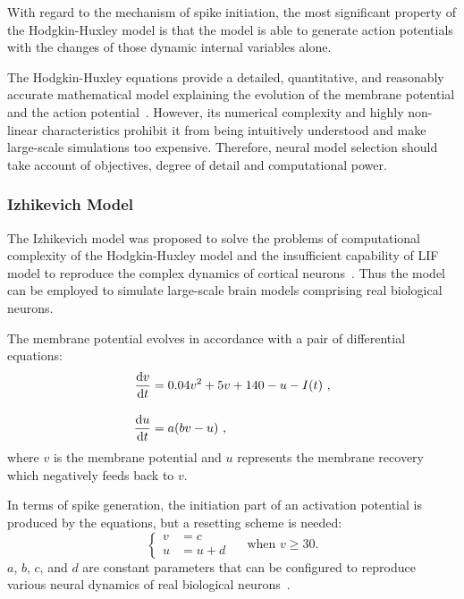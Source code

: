 With regard to the mechanism of spike initiation, the most significant property of the Hodgkin-Huxley model is that the model is able to generate action potentials with the changes of those dynamic internal variables alone.

The Hodgkin-Huxley equations provide a detailed, quantitative, and reasonably accurate mathematical model explaining the evolution of the membrane potential and the action potential~\citep{byrne2014molecules}.
However, its numerical complexity and highly non-linear characteristics prohibit it from being intuitively understood and make large-scale simulations too expensive.
Therefore, neural model selection should take account of objectives, degree of detail and computational power.

\subsubsection{Izhikevich Model}
The Izhikevich model was proposed to solve the problems of computational complexity of the Hodgkin-Huxley model and the insufficient capability of LIF model to reproduce the complex dynamics of cortical neurons~\citep{izhikevich2003simple}.
Thus the model can be employed to simulate large-scale brain models comprising real biological neurons.

The membrane potential evolves in accordance with a pair of differential equations:
\begin{equation}
\begin{aligned}
\dfrac{\mathrm{d} v}{\mathrm{d} t} &= 0.04v^2 + 5v + 140 - u - I(t)~,\\[10pt]
\dfrac{\mathrm{d} u}{\mathrm{d} t} &= a(bv - u)~,
\end{aligned}
\end{equation}
where $v$ is the membrane potential and $u$ represents the membrane recovery which negatively feeds back to $v$.

In terms of spike generation, the initiation part of an activation potential is produced by the equations, but a resetting scheme is needed:
\begin{equation}
\left\{
\begin{aligned}
v &= c \\
u &= u + d
\end{aligned}
\right.
\textrm{~~~~when~} v \geq 30.
\end{equation}  
$a$, $b$, $c$, and $d$ are constant parameters that can be configured to reproduce various neural dynamics of real biological neurons~\citep{izhikevich2004model}.

